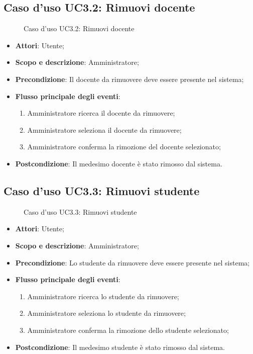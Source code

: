 \documentclass[12pt,a4paper]{article}
\begin{document}
\subsection{Caso d'uso UC3.2: Rimuovi  docente}
\begin{figure}[H]
	\centering

	\caption{Caso d'uso UC3.2: Rimuovi  docente}\label{fig:UC3.2} 
\end{figure}\begin{itemize}
\item \textbf{Attori}: Utente;
\item \textbf{Scopo e descrizione}: Amministratore; 
\item \textbf{Precondizione}: Il docente da rimuovere deve essere presente nel sistema;

\item \textbf{Flusso principale degli eventi}:
\begin{enumerate}
	\item Amministratore ricerca il docente da rimuovere;
	\item Amministratore seleziona il docente da rimuovere;
	\item Amministratore conferma la rimozione del docente selezionato;
	
\end{enumerate}
\item \textbf{Postcondizione}: Il medesimo docente è stato rimosso dal sistema.
\end{itemize}
\hypertarget{UC3.3}{}
\subsection{Caso d'uso UC3.3: Rimuovi  studente}
\begin{figure}[H]
	\centering

	\caption{Caso d'uso UC3.3: Rimuovi  studente}\label{fig:UC3.3} 
\end{figure}\begin{itemize}
\item \textbf{Attori}: Utente;
\item \textbf{Scopo e descrizione}: Amministratore; 
\item \textbf{Precondizione}: Lo studente da rimuovere deve essere presente nel sistema;

\item \textbf{Flusso principale degli eventi}:
\begin{enumerate}
	\item Amministratore ricerca lo studente da rimuovere;
	\item Amministratore seleziona lo studente da rimuovere;
	\item Amministratore conferma la rimozione dello studente selezionato;
	
\end{enumerate}
\item \textbf{Postcondizione}: Il medesimo studente è stato rimosso dal sistema.
\end{itemize}
\hypertarget{UC3.4}{}
\end{document}
